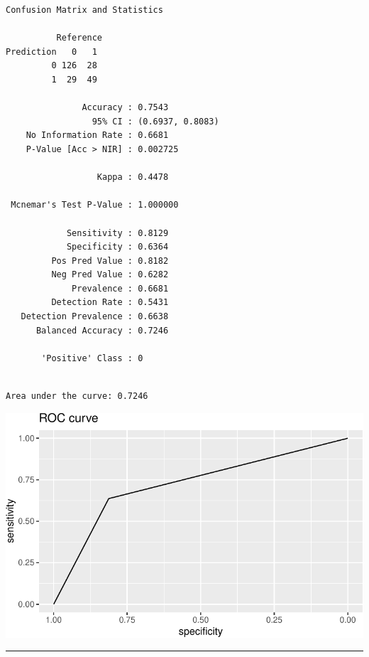 \documentclass[
  letterpaper,
  DIV=11,
  numbers=noendperiod]{scrartcl}
\begin{document}
\begin{verbatim}
Confusion Matrix and Statistics

          Reference
Prediction   0   1
         0 126  28
         1  29  49
                                          
               Accuracy : 0.7543          
                 95% CI : (0.6937, 0.8083)
    No Information Rate : 0.6681          
    P-Value [Acc > NIR] : 0.002725        
                                          
                  Kappa : 0.4478          
                                          
 Mcnemar's Test P-Value : 1.000000        
                                          
            Sensitivity : 0.8129          
            Specificity : 0.6364          
         Pos Pred Value : 0.8182          
         Neg Pred Value : 0.6282          
             Prevalence : 0.6681          
         Detection Rate : 0.5431          
   Detection Prevalence : 0.6638          
      Balanced Accuracy : 0.7246          
                                          
       'Positive' Class : 0               
                                          
\end{verbatim}

\begin{verbatim}
Area under the curve: 0.7246
\end{verbatim}

\includegraphics{L13_files/figure-pdf/unnamed-chunk-15-3.pdf}

\begin{center}\rule{0.5\linewidth}{0.5pt}\end{center}
\end{document}
